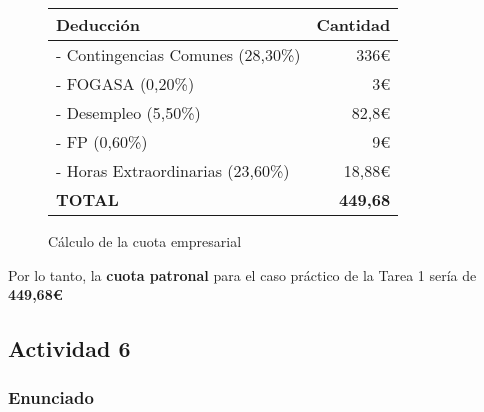 \begin{enumerate}[label=\alph*)]
\begin{figure}[H]
        \vspace{3ex}
        \centering

        \setlength{\tabcolsep}{10pt}
        \renewcommand{\arraystretch}{1.4}

        \begin{tabular}{| l | r |}
            \hline
            \textbf{Deducción}  & \textbf{Cantidad} \\ \hline
            \centering - Contingencias Comunes (28,30\%) & 336€ \\ \hline
            \centering - FOGASA (0,20\%) & 3€ \\ \hline
            \centering - Desempleo (5,50\%) & 82,8€  \\ \hline
            \centering - FP (0,60\%)& 9€ \\ \hline
            \centering - Horas Extraordinarias (23,60\%) & 18,88€  \\ \hline
            \centering \textbf{TOTAL} &  \textbf{449,68} \\ \hline
        \end{tabular}
        \caption{Cálculo de la cuota empresarial}
    \end{figure}

    Por lo tanto, la \textbf{cuota patronal} para el caso práctico de la Tarea 1 sería de \textbf{449,68€}
\end{enumerate}

\subsection{Actividad 6}

\subsubsection{Enunciado}

